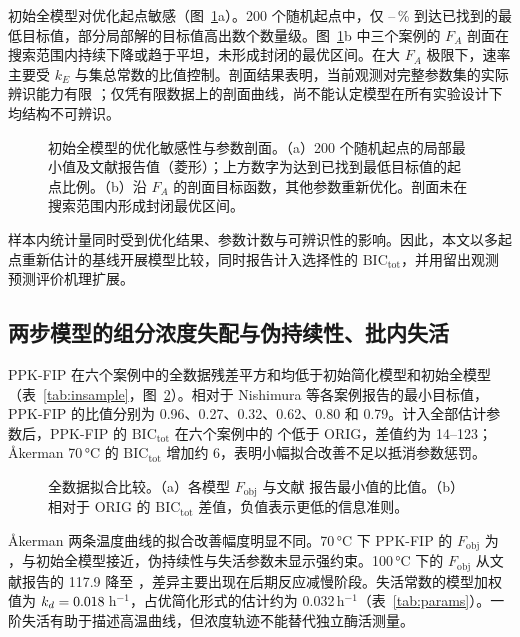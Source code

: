 初始全模型对优化起点敏感（图~\ref{fig:landscape}a）。200 个随机起点中，仅 \LandMinFrac--\LandMaxFrac\,\% 到达已找到的最低目标值，部分局部解的目标值高出数个数量级。图~\ref{fig:landscape}b 中三个案例的 $F_A$ 剖面在搜索范围内持续下降或趋于平坦，未形成封闭的最优区间。在大 $F_A$ 极限下，速率主要受 $k_E$ 与集总常数的比值控制。剖面结果表明，当前观测对完整参数集的实际辨识能力有限 \cite{raue2009,transtrum2015}；仅凭有限数据上的剖面曲线，尚不能认定模型在所有实验设计下均结构不可辨识。
\begin{figure}[!htbp]\centering{}\caption{初始全模型的优化敏感性与参数剖面。（a）200 个随机起点的局部最小值及文献报告值（菱形）；上方数字为达到已找到最低目标值的起点比例。（b）沿 $F_A$ 的剖面目标函数，其他参数重新优化。剖面未在搜索范围内形成封闭最优区间。}\label{fig:landscape}\end{figure}

样本内统计量同时受到优化结果、参数计数与可辨识性的影响。因此，本文以多起点重新估计的基线开展模型比较，同时报告计入选择性的 $\mathrm{BIC}_\mathrm{tot}$，并用留出观测预测评价机理扩展。

\subsection{两步模型的组分浓度失配与伪持续性、批内失活}
PPK-FIP 在六个案例中的全数据残差平方和均低于初始简化模型和初始全模型（表~\ref{tab:insample}，图~\ref{fig:insample}）。相对于 Nishimura 等各案例报告的最小目标值，PPK-FIP 的比值分别为 0.96、0.27、0.32、0.62、0.80 和 0.79。计入全部估计参数后，PPK-FIP 的 $\mathrm{BIC}_\mathrm{tot}$ 在六个案例中的 \InBICWins{} 个低于 ORIG，差值约为 14--123；Åkerman 70\,°C 的 $\mathrm{BIC}_\mathrm{tot}$ 增加约 6，表明小幅拟合改善不足以抵消参数惩罚。
\begin{figure}[!htbp]\centering{}\caption{全数据拟合比较。（a）各模型 $F_\mathrm{obj}$ 与文献 \cite{nishimura2026} 报告最小值的比值。（b）相对于 ORIG 的 $\mathrm{BIC}_\mathrm{tot}$ 差值，负值表示更低的信息准则。}\label{fig:insample}\end{figure}

Åkerman 两条温度曲线的拟合改善幅度明显不同。70\,°C 下 PPK-FIP 的 $F_\mathrm{obj}$ 为 \InAkSeventyFnew，与初始全模型接近，伪持续性与失活参数未显示强约束。100\,°C 下的 $F_\mathrm{obj}$ 从文献报告的 117.9 降至 \InAkHundredFnew，差异主要出现在后期反应减慢阶段。失活常数的模型加权值为 $k_d=0.018$\,h$^{-1}$，占优简化形式的估计约为 0.032\,h$^{-1}$（表~\ref{tab:params}）。一阶失活有助于描述高温曲线，但浓度轨迹不能替代独立酶活测量。

